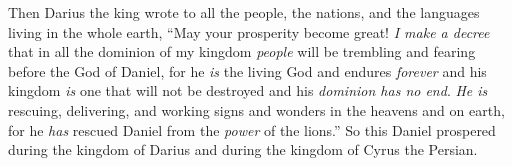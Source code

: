 \begin{biblechapter}
 Then Darius the king wrote to all the people, the nations, and the languages living in the whole earth, “May your prosperity become great!
\verse \textit{I make a decree} that in all the dominion of my kingdom \textit{people} will be trembling and fearing before the God of Daniel, for he \textit{is} the living God and endures \textit{forever} and his kingdom \textit{is} one that will not be destroyed and his \textit{dominion has no end}.
\verse \textit{He is} rescuing, delivering, and working signs and wonders in the heavens and on earth, for he \textit{has} rescued Daniel from the \textit{power} of the lions.”
\verse So this Daniel prospered during the kingdom of Darius and during the kingdom of Cyrus the Persian.
\end{biblechapter}

